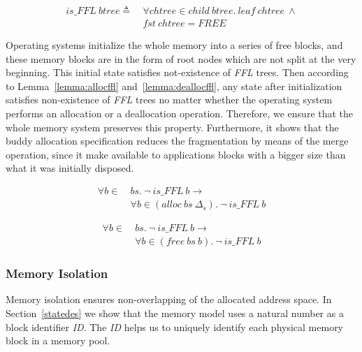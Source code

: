 \begin{definition} 
\label{def:FF4}
\end{definition}
\vspace{-7pt}
\begin{align*}
is\_FFL\ btree \triangleq\ &\forall chtree \in child\ btree.\ leaf\ chtree\ \wedge \\
&fst\ chtree = FREE
\end{align*}
\vspace{-12pt}

Operating systems initialize the whole memory into a series of free blocks, and these memory blocks are in the form of root nodes which are not split at the very beginning. This initial state satisfies not-existence of \emph{FFL} trees. Then according to Lemma~\ref{lemma:allocffl} and~\ref{lemma:deallocffl}, any state after initialization satisfies non-existence of \emph{FFL} trees no matter whether the operating system performs an allocation or a deallocation operation. Therefore, we ensure that the whole memory system preserves this property. Furthermore, it shows that the buddy allocation specification reduces the fragmentation by means of the merge operation, since it make available to applications blocks with a bigger size than what it was initially disposed.

\begin{lemma} 
\label{lemma:allocffl}
\begin{align*}
\forall b \in\ &bs.\ \neg\ is\_FFL\ b \longrightarrow \\
&\forall b \in (alloc\ bs\ \Delta_s).\ \neg\ is\_FFL\ b
\end{align*}
\end{lemma}

\begin{lemma} 
\label{lemma:deallocffl}
\begin{align*}
\forall b \in\ &bs.\ \neg\ is\_FFL\ b \longrightarrow \\
&\forall b \in (free\ bs\ b).\ \neg\ is\_FFL\ b
\end{align*}
\end{lemma}

\subsubsection{Memory Isolation}
Memory isolation ensures non-overlapping of the allocated address space. In Section~\ref{statedes} we show that the memory model uses a natural number as a block identifier \emph{ID}. The \emph{ID} helps us to uniquely identify each physical memory block in a memory pool.

